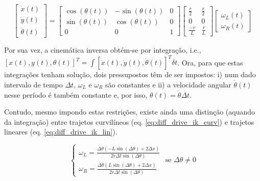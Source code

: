 \documentclass{article}
\begin{document}
\begin{equation}
    \begin{bmatrix}
        \dot{x}(t) \\
        \dot{y}(t) \\
        \dot{\theta}(t) 
    \end{bmatrix} = 
    \begin{bmatrix}
        \cos(\theta(t)) & -\sin(\theta(t)) & 0 \\
        \sin(\theta(t)) & \cos(\theta(t)) & 0 \\
        0 & 0 & 1
    \end{bmatrix}
    \begin{bmatrix}
        \frac{r}{2} & \frac{r}{2} \\
        0 & 0 \\
        \frac{-r}{L} & \frac{r}{L}
    \end{bmatrix}
    \begin{bmatrix}
        \omega_L(t) \\
        \omega_R(t)
    \end{bmatrix}
    \label{eq:diff_drive_FK}
\end{equation}

Por sua vez, a cinemática inversa obtém-se por integração, i.e., $[x(t), y(t), \theta (t)]^T = \int [\dot{x}(t), \dot{y}(t), \dot{\theta}(t)]^T \delta t$. Ora, para que estas integrações tenham solução, dois pressupostos têm de ser impostos: i) num dado intervalo de tempo $\Delta t$, $\omega_L$ e $\omega_R$ são constantes e ii) a velocidade angular $\dot{\theta}(t)$ nesse período é também constante e, por isso, $\theta (t) = \dot{\theta} \Delta t$. 

Contudo, mesmo impondo estas restrições, existe ainda uma distinção (aquando da integração) entre trajetos curvilíneos (eq. \ref{eq:diff_drive_ik_curv}) e trajetos lineares (eq. \ref{eq:diff_drive_ik_lin}).

\begin{equation}
    \begin{cases}
        \omega_{L} = \frac{\Delta \theta \left(- L \sin{\left(\Delta \theta \right)} + 2 \Delta x\right)}{2 r \Delta t \sin{\left(\Delta \theta \right)}} \\
        \omega_{R} = \frac{\Delta \theta \left(L 
        \sin{\left(\Delta \theta \right)} + 2 \Delta x\right)}{2 r \Delta t \sin{\left(\Delta \theta \right)}}
    \end{cases}
    \text{ se } \Delta \theta \neq 0
    \label{eq:diff_drive_ik_curv}
\end{equation}
\end{document}
